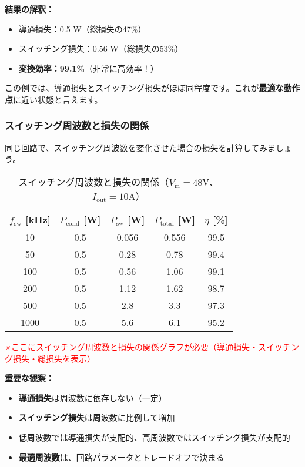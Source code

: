 \begin{screen}
\textbf{結果の解釈：}

\begin{itemize}
\item 導通損失：0.5 W（総損失の47\%）
\item スイッチング損失：0.56 W（総損失の53\%）
\item \textbf{変換効率：99.1\%}（非常に高効率！）
\end{itemize}

この例では、導通損失とスイッチング損失がほぼ同程度です。これが\textbf{最適な動作点}に近い状態と言えます。
\end{screen}

\subsubsection{スイッチング周波数と損失の関係}

同じ回路で、スイッチング周波数を変化させた場合の損失を計算してみましょう。

\begin{table}[H]
\centering
\caption{スイッチング周波数と損失の関係（$V_{\text{in}}=48$V、$I_{\text{out}}=10$A）}
\begin{tabular}{|c|c|c|c|c|}
\hline
\textbf{$f_{\text{sw}}$ [kHz]} & \textbf{$P_{\text{cond}}$ [W]} & \textbf{$P_{\text{sw}}$ [W]} & \textbf{$P_{\text{total}}$ [W]} & \textbf{$\eta$ [\%]} \\
\hline
\hline
10 & 0.5 & 0.056 & 0.556 & 99.5 \\
\hline
50 & 0.5 & 0.28 & 0.78 & 99.4 \\
\hline
100 & 0.5 & 0.56 & 1.06 & 99.1 \\
\hline
200 & 0.5 & 1.12 & 1.62 & 98.7 \\
\hline
500 & 0.5 & 2.8 & 3.3 & 97.3 \\
\hline
1000 & 0.5 & 5.6 & 6.1 & 95.2 \\
\hline
\end{tabular}
\end{table}

\textcolor{red}{※ここにスイッチング周波数と損失の関係グラフが必要（導通損失・スイッチング損失・総損失を表示）}

\begin{screen}
\textbf{重要な観察：}

\begin{itemize}
\item \textbf{導通損失}は周波数に依存しない（一定）
\item \textbf{スイッチング損失}は周波数に比例して増加
\item 低周波数では導通損失が支配的、高周波数ではスイッチング損失が支配的
\item \textbf{最適周波数}は、回路パラメータとトレードオフで決まる
\end{itemize}
\end{screen}

